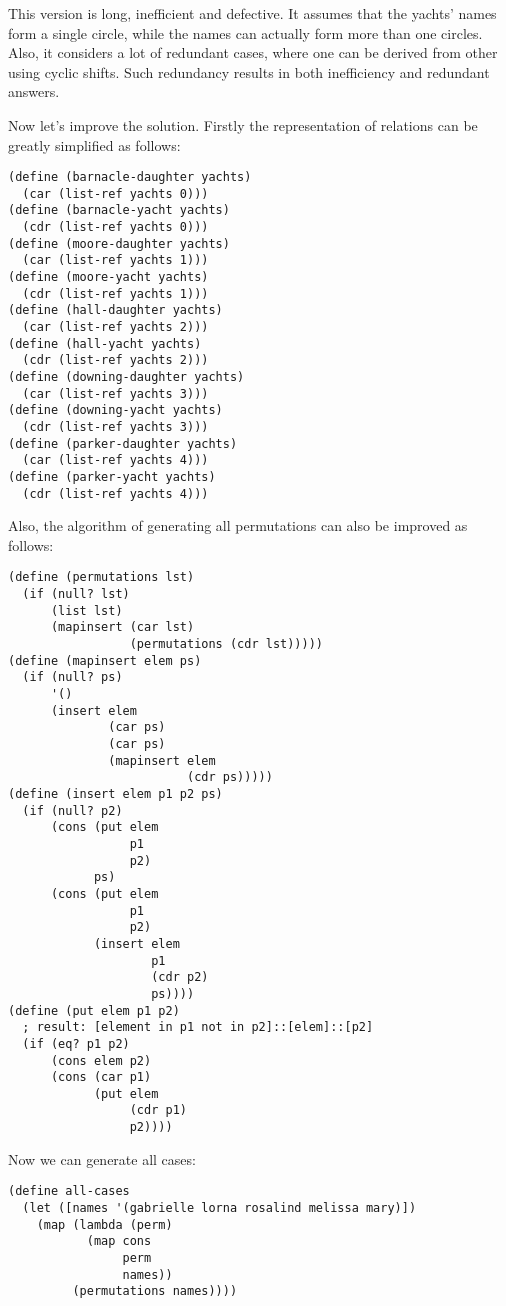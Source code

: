 \documentclass[../main.tex]{subfiles}
\begin{document}
This version is long, inefficient and defective. It assumes that the yachts' names form a single circle, while the names can actually form more than one circles. Also, it considers a lot of redundant cases, where one can be derived from other using cyclic shifts. Such redundancy results in both inefficiency and redundant answers.

Now let's improve the solution. Firstly the representation of relations can be greatly simplified as follows:

\begin{lstlisting}
(define (barnacle-daughter yachts)
  (car (list-ref yachts 0)))
(define (barnacle-yacht yachts)
  (cdr (list-ref yachts 0)))
(define (moore-daughter yachts)
  (car (list-ref yachts 1)))
(define (moore-yacht yachts)
  (cdr (list-ref yachts 1)))
(define (hall-daughter yachts)
  (car (list-ref yachts 2)))
(define (hall-yacht yachts)
  (cdr (list-ref yachts 2)))
(define (downing-daughter yachts)
  (car (list-ref yachts 3)))
(define (downing-yacht yachts)
  (cdr (list-ref yachts 3)))
(define (parker-daughter yachts)
  (car (list-ref yachts 4)))
(define (parker-yacht yachts)
  (cdr (list-ref yachts 4)))
\end{lstlisting}

Also, the algorithm of generating all permutations can also be improved as follows:

\begin{lstlisting}
(define (permutations lst)
  (if (null? lst)
      (list lst)
      (mapinsert (car lst)
                 (permutations (cdr lst)))))
(define (mapinsert elem ps)
  (if (null? ps)
      '()
      (insert elem
              (car ps)
              (car ps)
              (mapinsert elem
                         (cdr ps)))))
(define (insert elem p1 p2 ps)
  (if (null? p2)
      (cons (put elem
                 p1
                 p2)
            ps)
      (cons (put elem
                 p1
                 p2)
            (insert elem
                    p1
                    (cdr p2)
                    ps))))
(define (put elem p1 p2)
  ; result: [element in p1 not in p2]::[elem]::[p2]
  (if (eq? p1 p2)
      (cons elem p2)
      (cons (car p1)
            (put elem
                 (cdr p1)
                 p2))))
\end{lstlisting}

Now we can generate all cases:

\begin{lstlisting}
(define all-cases
  (let ([names '(gabrielle lorna rosalind melissa mary)])
    (map (lambda (perm)
           (map cons
                perm
                names))
         (permutations names))))
\end{lstlisting}
\end{document}
